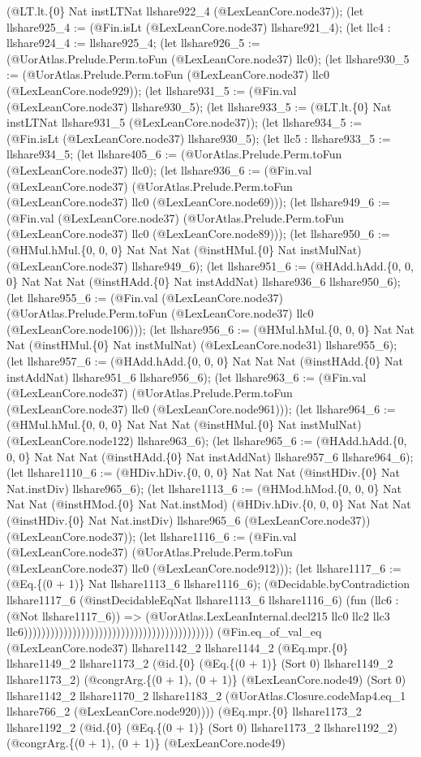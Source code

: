 \documentclass[11pt]{article}
\begin{document}
(@LT.lt.\{0\} Nat instLTNat llshare922\_4 (@LexLeanCore.node37)); (let llshare925\_4 := (@Fin.isLt (@LexLeanCore.node37) llshare921\_4); (let llc4 : llshare924\_4 := llshare925\_4; (let llshare926\_5 := (@UorAtlas.Prelude.Perm.toFun (@LexLeanCore.node37) llc0); (let llshare930\_5 := (@UorAtlas.Prelude.Perm.toFun (@LexLeanCore.node37) llc0 (@LexLeanCore.node929)); (let llshare931\_5 := (@Fin.val (@LexLeanCore.node37) llshare930\_5); (let llshare933\_5 := (@LT.lt.\{0\} Nat instLTNat llshare931\_5 (@LexLeanCore.node37)); (let llshare934\_5 := (@Fin.isLt (@LexLeanCore.node37) llshare930\_5); (let llc5 : llshare933\_5 := llshare934\_5; (let llshare405\_6 := (@UorAtlas.Prelude.Perm.toFun (@LexLeanCore.node37) llc0); (let llshare936\_6 := (@Fin.val (@LexLeanCore.node37) (@UorAtlas.Prelude.Perm.toFun (@LexLeanCore.node37) llc0 (@LexLeanCore.node69))); (let llshare949\_6 := (@Fin.val (@LexLeanCore.node37) (@UorAtlas.Prelude.Perm.toFun (@LexLeanCore.node37) llc0 (@LexLeanCore.node89))); (let llshare950\_6 := (@HMul.hMul.\{0, 0, 0\} Nat Nat Nat (@instHMul.\{0\} Nat instMulNat) (@LexLeanCore.node37) llshare949\_6); (let llshare951\_6 := (@HAdd.hAdd.\{0, 0, 0\} Nat Nat Nat (@instHAdd.\{0\} Nat instAddNat) llshare936\_6 llshare950\_6); (let llshare955\_6 := (@Fin.val (@LexLeanCore.node37) (@UorAtlas.Prelude.Perm.toFun (@LexLeanCore.node37) llc0 (@LexLeanCore.node106))); (let llshare956\_6 := (@HMul.hMul.\{0, 0, 0\} Nat Nat Nat (@instHMul.\{0\} Nat instMulNat) (@LexLeanCore.node31) llshare955\_6); (let llshare957\_6 := (@HAdd.hAdd.\{0, 0, 0\} Nat Nat Nat (@instHAdd.\{0\} Nat instAddNat) llshare951\_6 llshare956\_6); (let llshare963\_6 := (@Fin.val (@LexLeanCore.node37) (@UorAtlas.Prelude.Perm.toFun (@LexLeanCore.node37) llc0 (@LexLeanCore.node961))); (let llshare964\_6 := (@HMul.hMul.\{0, 0, 0\} Nat Nat Nat (@instHMul.\{0\} Nat instMulNat) (@LexLeanCore.node122) llshare963\_6); (let llshare965\_6 := (@HAdd.hAdd.\{0, 0, 0\} Nat Nat Nat (@instHAdd.\{0\} Nat instAddNat) llshare957\_6 llshare964\_6); (let llshare1110\_6 := (@HDiv.hDiv.\{0, 0, 0\} Nat Nat Nat (@instHDiv.\{0\} Nat Nat.instDiv) llshare965\_6); (let llshare1113\_6 := (@HMod.hMod.\{0, 0, 0\} Nat Nat Nat (@instHMod.\{0\} Nat Nat.instMod) (@HDiv.hDiv.\{0, 0, 0\} Nat Nat Nat (@instHDiv.\{0\} Nat Nat.instDiv) llshare965\_6 (@LexLeanCore.node37)) (@LexLeanCore.node37)); (let llshare1116\_6 := (@Fin.val (@LexLeanCore.node37) (@UorAtlas.Prelude.Perm.toFun (@LexLeanCore.node37) llc0 (@LexLeanCore.node912))); (let llshare1117\_6 := (@Eq.\{(0 + 1)\} Nat llshare1113\_6 llshare1116\_6); (@Decidable.byContradiction llshare1117\_6 (@instDecidableEqNat llshare1113\_6 llshare1116\_6) (fun (llc6 : (@Not llshare1117\_6)) => (@UorAtlas.LexLeanInternal.decl215 llc0 llc2 llc3 llc6))))))))))))))))))))))))))))))))))))))))))) (@Fin.eq\_of\_val\_eq (@LexLeanCore.node37) llshare1142\_2 llshare1144\_2 (@Eq.mpr.\{0\} llshare1149\_2 llshare1173\_2 (@id.\{0\} (@Eq.\{(0 + 1)\} (Sort 0) llshare1149\_2 llshare1173\_2) (@congrArg.\{(0 + 1), (0 + 1)\} (@LexLeanCore.node49) (Sort 0) llshare1142\_2 llshare1170\_2 llshare1183\_2 (@UorAtlas.Closure.codeMap4.eq\_1 llshare766\_2 (@LexLeanCore.node920)))) (@Eq.mpr.\{0\} llshare1173\_2 llshare1192\_2 (@id.\{0\} (@Eq.\{(0 + 1)\} (Sort 0) llshare1173\_2 llshare1192\_2) (@congrArg.\{(0 + 1), (0 + 1)\} (@LexLeanCore.node49) 
\end{document}
